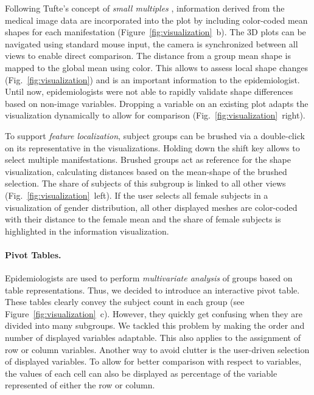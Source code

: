 \documentclass[journal]{style/vgtc} 			          %
\begin{document}
Following Tufte's concept of \emph{small multiples} \cite{Tufte1983}, information derived from the medical image data are incorporated into the plot by including color-coded mean shapes for each manifestation (Figure~\ref{fig:visualization}~b).
%
The 3D plots can be navigated using standard mouse input, the camera is synchronized between all views to enable direct comparison.
%
The distance from a group mean shape is mapped to the global mean using color.
%
This allows to assess local shape changes (Fig.~\ref{fig:visualization}) and is an important information to the epidemiologist.
%
Until now, epidemiologists were not able to rapidly validate shape differences based on non-image variables.
%
Dropping a variable on an existing plot adapts the visualization dynamically to allow for comparison (Fig.~\ref{fig:visualization}~right).

To support \emph{feature localization}, subject groups can be brushed via a double-click on its representative in the visualizations.
%
Holding down the shift key allows to select multiple manifestations.
%
Brushed groups act as reference for the shape visualization, calculating distances based on the mean-shape of the brushed selection.
%
The share of subjects of this subgroup is linked to all other views (Fig.~\ref{fig:visualization}~left).
%
If the user selects all female subjects in a visualization of gender distribution, all other displayed meshes are color-coded with their distance to the female mean and the share of female subjects is highlighted in the information visualization.
%
\paragraph{Pivot Tables.}
%
Epidemiologists are used to perform \emph{multivariate analysis} of groups based on table representations.
%
Thus, we decided to introduce an interactive pivot table.
%
These tables clearly convey the subject count in each group (see Figure~\ref{fig:visualization}~c).
%
However, they quickly get confusing when they are divided into many subgroups.
%
We tackled this problem by making the order and number of displayed variables adaptable.
%
This also applies to the assignment of row or column variables.
%
Another way to avoid clutter is the user-driven selection of displayed variables.
%
To allow for better comparison with respect to variables, the values of each cell can also be displayed as percentage of the variable represented of either the row or column.
\end{document}
